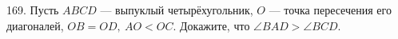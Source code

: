 169. Пусть $ABCD$ --- выпуклый четырёхугольник, $O$ --- точка пересечения его диагоналей, $OB=OD,\ AO<OC.$ Докажите, что $\angle BAD > \angle BCD.$\\
